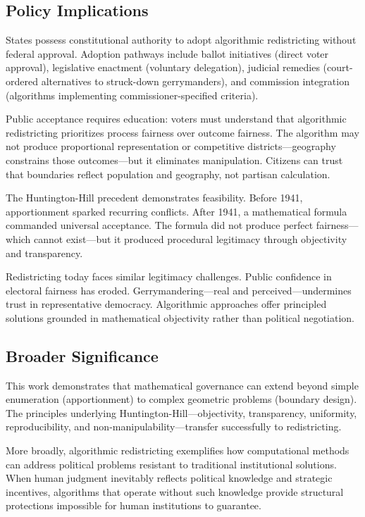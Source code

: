 \subsection{Policy Implications}

States possess constitutional authority to adopt algorithmic redistricting without federal approval. Adoption pathways include ballot initiatives (direct voter approval), legislative enactment (voluntary delegation), judicial remedies (court-ordered alternatives to struck-down gerrymanders), and commission integration (algorithms implementing commissioner-specified criteria).

Public acceptance requires education: voters must understand that algorithmic redistricting prioritizes process fairness over outcome fairness. The algorithm may not produce proportional representation or competitive districts—geography constrains those outcomes—but it eliminates manipulation. Citizens can trust that boundaries reflect population and geography, not partisan calculation.

The Huntington-Hill precedent demonstrates feasibility. Before 1941, apportionment sparked recurring conflicts. After 1941, a mathematical formula commanded universal acceptance. The formula did not produce perfect fairness—which cannot exist—but it produced procedural legitimacy through objectivity and transparency.

Redistricting today faces similar legitimacy challenges. Public confidence in electoral fairness has eroded. Gerrymandering—real and perceived—undermines trust in representative democracy. Algorithmic approaches offer principled solutions grounded in mathematical objectivity rather than political negotiation.

\subsection{Broader Significance}

This work demonstrates that mathematical governance can extend beyond simple enumeration (apportionment) to complex geometric problems (boundary design). The principles underlying Huntington-Hill—objectivity, transparency, uniformity, reproducibility, and non-manipulability—transfer successfully to redistricting.

More broadly, algorithmic redistricting exemplifies how computational methods can address political problems resistant to traditional institutional solutions. When human judgment inevitably reflects political knowledge and strategic incentives, algorithms that operate without such knowledge provide structural protections impossible for human institutions to guarantee.

